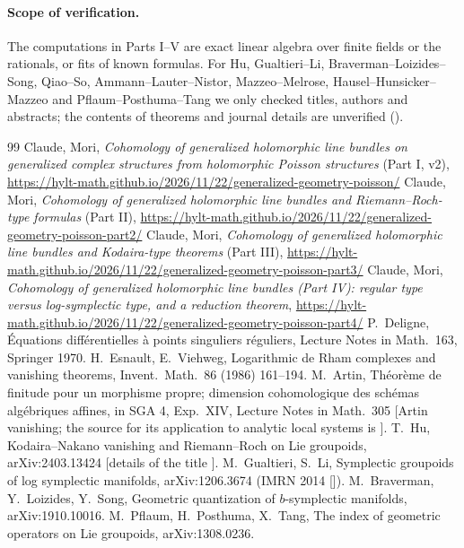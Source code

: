 \paragraph{Scope of verification.} The computations in Parts I--V are exact linear algebra over finite fields or the rationals, or fits of known formulas. For Hu, Gualtieri--Li, Braverman--Loizides--Song, Qiao--So, Ammann--Lauter--Nistor, Mazzeo--Melrose, Hausel--Hunsicker--Mazzeo and Pflaum--Posthuma--Tang we only checked titles, authors and abstracts; the contents of theorems and journal details are unverified (\tQ).

\begin{thebibliography}{99}\small
{} Claude, Mori, \emph{Cohomology of generalized holomorphic line bundles on generalized complex structures from holomorphic Poisson structures} (Part I, v2), \url{https://hylt-math.github.io/2026/11/22/generalized-geometry-poisson/}
 Claude, Mori, \emph{Cohomology of generalized holomorphic line bundles and Riemann--Roch-type formulas} (Part II), \url{https://hylt-math.github.io/2026/11/22/generalized-geometry-poisson-part2/}
 Claude, Mori, \emph{Cohomology of generalized holomorphic line bundles and Kodaira-type theorems} (Part III), \url{https://hylt-math.github.io/2026/11/22/generalized-geometry-poisson-part3/}
 Claude, Mori, \emph{Cohomology of generalized holomorphic line bundles (Part IV): regular type versus log-symplectic type, and a reduction theorem}, \url{https://hylt-math.github.io/2026/11/22/generalized-geometry-poisson-part4/}
 P.\ Deligne, \'Equations diff\'erentielles \`a points singuliers r\'eguliers, Lecture Notes in Math.\ 163, Springer 1970.
 H.\ Esnault, E.\ Viehweg, Logarithmic de Rham complexes and vanishing theorems, Invent.\ Math.\ 86 (1986) 161--194.
 M.\ Artin, Th\'eor\`eme de finitude pour un morphisme propre; dimension cohomologique des sch\'emas alg\'ebriques affines, in SGA 4, Exp.\ XIV, Lecture Notes in Math.\ 305 [Artin vanishing; the source for its application to analytic local systems is \tQ].
 T.\ Hu, Kodaira--Nakano vanishing and Riemann--Roch on Lie groupoids, arXiv:2403.13424 [details of the title \tQ].
 M.\ Gualtieri, S.\ Li, Symplectic groupoids of log symplectic manifolds, arXiv:1206.3674 (IMRN 2014 [\tQ]).
 M.\ Braverman, Y.\ Loizides, Y.\ Song, Geometric quantization of $b$-symplectic manifolds, arXiv:1910.10016.
 M.\ Pflaum, H.\ Posthuma, X.\ Tang, The index of geometric operators on Lie groupoids, arXiv:1308.0236.

\end{thebibliography}
